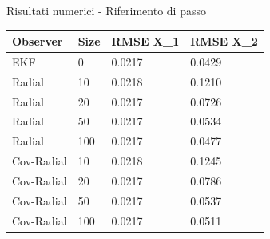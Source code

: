 \documentclass{beamer}
\begin{document}
\begin{frame}{Risultati numerici - Riferimento di passo}
    \begin{table}[]
        \begin{tabular}{|llll|}
        \hline
        \textbf{Observer} & \textbf{Size} & \textbf{RMSE X\_1} & \textbf{RMSE X\_2} \\    \hline
        EKF         &   0   &   0.0217  &   0.0429  \\  \hline
        Radial      &   10  &   0.0218  &   0.1210  \\
        Radial      &   20  &   0.0217  &   0.0726  \\
        Radial      &   50  &   0.0217  &   0.0534  \\
        Radial      &   100 &   0.0217  &   0.0477  \\  \hline
        Cov-Radial  &   10  &   0.0218  &   0.1245  \\
        Cov-Radial  &   20  &   0.0217  &   0.0786  \\
        Cov-Radial  &   50  &   0.0217  &   0.0537  \\
        Cov-Radial  &   100 &   0.0217  &   0.0511  \\ \hline
        \end{tabular}
        \end{table}
\end{frame}
\end{document}
